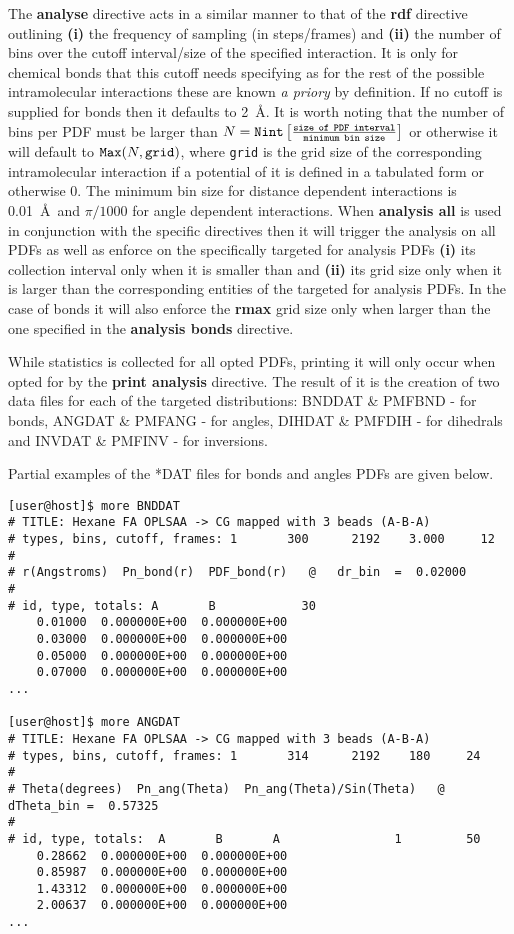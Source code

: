 The {\bf analyse} directive acts in a similar manner to
that of the {\bf rdf} directive outlining {\bf (i)} the
frequency of sampling (in steps/frames) and {\bf (ii)} the
number of bins over the cutoff interval/size of the
specified interaction.  It is only for chemical bonds
that this cutoff needs specifying as for the rest of
the possible intramolecular interactions these are known
{\em a priory} by definition.  If no cutoff is supplied
for bonds then it defaults to 2~\AA.  It is worth noting
that the number of bins per PDF must be larger than
$N = {\tt Nint} \left[ \frac{\tt size~of~PDF~interval}{\tt minimum~bin~size} \right]$
or otherwise it will default to ${\tt Max}(N,{\tt grid})$, where
{\tt grid} is the grid size of the corresponding intramolecular
interaction if a potential of it is defined in a tabulated
form or otherwise $0$.  The minimum bin size for distance
dependent interactions is 0.01~\AA~and $\pi/1000$ for angle
dependent interactions.  When {\bf analysis all} is used in
conjunction with the specific directives then it will
trigger the analysis on all PDFs as well as enforce on the
specifically targeted for analysis PDFs {\bf (i)} its
collection interval only when it is smaller than and
{\bf (ii)} its grid size only when it is larger than
the corresponding entities of the targeted for analysis
PDFs.  In the case of bonds it will also enforce the
{\bf rmax} grid size only when larger than the one
specified in the {\bf analysis bonds} directive.

While statistics is collected for all opted PDFs, printing
it will only occur when opted for by the {\bf print analysis}
directive.  The result of it is the creation of two data files
for each of the targeted distributions: BNDDAT \& PMFBND -
for bonds, ANGDAT \& PMFANG - for angles, DIHDAT \& PMFDIH -
for dihedrals and INVDAT \& PMFINV - for inversions.

Partial examples of the *DAT files for bonds and angles PDFs
are given below.

\begin{verbatim}
[user@host]$ more BNDDAT
# TITLE: Hexane FA OPLSAA -> CG mapped with 3 beads (A-B-A)
# types, bins, cutoff, frames: 1       300      2192    3.000     12
#
# r(Angstroms)  Pn_bond(r)  PDF_bond(r)   @   dr_bin  =  0.02000
#
# id, type, totals: A       B            30
    0.01000  0.000000E+00  0.000000E+00
    0.03000  0.000000E+00  0.000000E+00
    0.05000  0.000000E+00  0.000000E+00
    0.07000  0.000000E+00  0.000000E+00
...

[user@host]$ more ANGDAT
# TITLE: Hexane FA OPLSAA -> CG mapped with 3 beads (A-B-A)
# types, bins, cutoff, frames: 1       314      2192    180     24
#
# Theta(degrees)  Pn_ang(Theta)  Pn_ang(Theta)/Sin(Theta)   @   dTheta_bin =  0.57325
#
# id, type, totals:  A       B       A                1         50
    0.28662  0.000000E+00  0.000000E+00
    0.85987  0.000000E+00  0.000000E+00
    1.43312  0.000000E+00  0.000000E+00
    2.00637  0.000000E+00  0.000000E+00
...
\end{verbatim}

